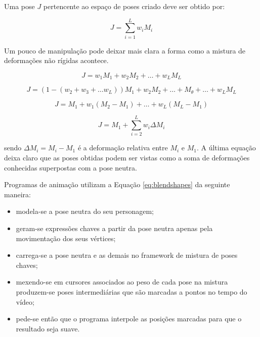 {    Uma pose $J$ pertencente ao espaço de poses criado deve ser obtido por:    

\begin{equation}
    	J = \sum_{i=1}^L  w_i M_i
        \label{eq:J-mistura}
\end{equation}

Um pouco de manipulação pode deixar mais clara a forma como a mistura de
deformações não rígidas acontece.

\begin{equation}
    	J = w_1 M_1 + w_2 M_2 + \ldots + w_L M_L
\end{equation}

\begin{equation}
    	J = (1-(w_2 + w_3 + \ldots w_L)) M_1 + w_2 M_2 + \ldots + M_\theta + \ldots + w_L M_L
\end{equation}

\begin{equation}
    	J = M_1 + w_1(M_2 - M_1) + \ldots + w_L (M_L - M_1)
\end{equation}

\begin{equation}
    	J = M_1 + \sum_{i = 2}^L w_i \Delta M_i
        \label{eq:blendshapes}
\end{equation}

sendo $\Delta M_i = M_i - M_1$ é a deformação relativa entre $M_i$ e $M_1$. A
última equação deixa claro que as poses obtidas podem ser vistas como a soma de
deformações conhecidas superpostas com a pose neutra. 

Programas de animação utilizam a Equação \ref{eq:blendshapes} da seguinte
maneira: \begin{itemize}

  \item modela-se a pose neutra do seu personagem; 

    \item geram-se expressões chaves a partir da pose neutra apenas pela
      movimentação dos seus vértices;

    \item carrega-se a pose neutra e as demais no framework de mistura de poses
      chaves;

    \item mexendo-se em cursores associados ao peso de cada pose na mistura
      produzem-se  poses intermediárias que são marcadas a pontos no tempo do
      vídeo;

    \item pede-se então que o programa interpole as posições marcadas para que o
      resultado seja suave.


\end{itemize}}
